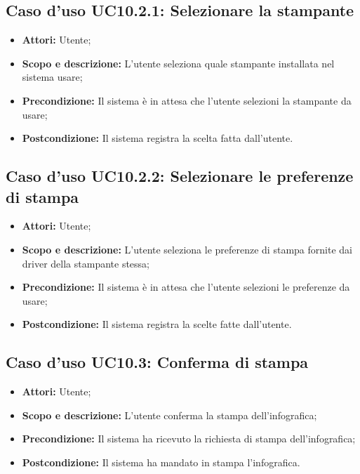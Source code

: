 	\subsection{Caso d'uso UC10.2.1: Selezionare la stampante}
	\begin{itemize}
		\item \textbf{Attori:} Utente;
		\item \textbf{Scopo e descrizione:} L'utente seleziona quale stampante installata nel sistema usare;
		\item \textbf{Precondizione:} Il sistema è in attesa che l'utente selezioni la stampante da usare;
		\item \textbf{Postcondizione:} Il sistema registra la scelta fatta dall'utente.
	\end{itemize}
	
	\subsection{Caso d'uso UC10.2.2: Selezionare le preferenze di stampa}
	\begin{itemize}
		\item \textbf{Attori:} Utente;
		\item \textbf{Scopo e descrizione:} L'utente seleziona le preferenze di stampa fornite dai driver della stampante stessa;
		\item \textbf{Precondizione:} Il sistema è in attesa che l'utente selezioni le preferenze da usare;
		\item \textbf{Postcondizione:} Il sistema registra la scelte fatte dall'utente.
	\end{itemize}

\subsection{Caso d'uso UC10.3: Conferma di stampa}
\begin{itemize}
	\item \textbf{Attori:} Utente;
	\item \textbf{Scopo e descrizione:} L'utente conferma la stampa dell'infografica;
	\item \textbf{Precondizione:} Il sistema ha ricevuto la richiesta di stampa dell'infografica;
	\item \textbf{Postcondizione:} Il sistema ha mandato in stampa l'infografica.
\end{itemize}

\newpage